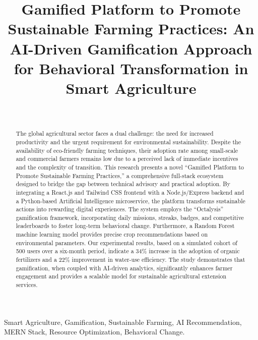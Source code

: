 \documentclass[journal]{IEEEtran}
\begin{document}
\title{Gamified Platform to Promote Sustainable Farming Practices: An AI-Driven Gamification Approach for Behavioral Transformation in Smart Agriculture}

\author{
     \\
}

\maketitle

\begin{abstract}
The global agricultural sector faces a dual challenge: the need for increased productivity and the urgent requirement for environmental sustainability. Despite the availability of eco-friendly farming techniques, their adoption rate among small-scale and commercial farmers remains low due to a perceived lack of immediate incentives and the complexity of transition. This research presents a novel ``Gamified Platform to Promote Sustainable Farming Practices,'' a comprehensive full-stack ecosystem designed to bridge the gap between technical advisory and practical adoption. By integrating a React.js and Tailwind CSS frontend with a Node.js/Express backend and a Python-based Artificial Intelligence microservice, the platform transforms sustainable actions into rewarding digital experiences. The system employs the ``Octalysis'' gamification framework, incorporating daily missions, streaks, badges, and competitive leaderboards to foster long-term behavioral change. Furthermore, a Random Forest machine learning model provides precise crop recommendations based on environmental parameters. Our experimental results, based on a simulated cohort of 500 users over a six-month period, indicate a 34\% increase in the adoption of organic fertilizers and a 22\% improvement in water-use efficiency. The study demonstrates that gamification, when coupled with AI-driven analytics, significantly enhances farmer engagement and provides a scalable model for sustainable agricultural extension services.
\end{abstract}

\begin{IEEEkeywords}
Smart Agriculture, Gamification, Sustainable Farming, AI Recommendation, MERN Stack, Resource Optimization, Behavioral Change.
\end{IEEEkeywords}
\end{document}
